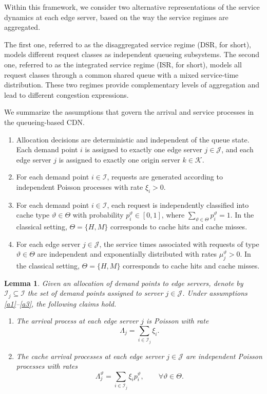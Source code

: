 \documentclass[a4paper,11pt,reqno]{amsart}
\newtheorem{lemma}{Lemma}
\newcommand{\K}{\mathcal{K}}
\newcommand{\I}{\mathcal{I}}
\newcommand{\J}{\mathcal{J}}
\begin{document}
Within this framework, we consider two alternative representations of the service dynamics at each edge server, based on the way the service regimes are aggregated.

The first one, referred to as the disaggregated service regime (DSR, for short), models different request classes as independent queueing subsystems. The second one, referred to as the integrated service regime (ISR, for short), models all request classes through a common shared queue with a mixed service-time distribution. These two regimes provide complementary levels of aggregation and lead to different congestion expressions.

We summarize the assumptions that govern the arrival and service processes in the queueing-based CDN.

\begin{enumerate}[label=(A\arabic*), ref={\rm A\arabic*}]
\item \label{a1}
Allocation decisions are deterministic and independent of the queue state. Each demand point $i$ is assigned to exactly one edge server $j\in\J$, and each edge server $j$ is assigned to exactly one origin server $k\in\K$.

\item \label{a2}
For each demand point $i\in\I$, requests are generated according to independent Poisson processes with rate $\xi_i>0$.

\item \label{a3}
For each demand point $i\in\I$, each request is independently classified into cache type $\vartheta \in \Theta$ with probability $p_i^\vartheta \in [0,1]$, where $\sum_{\vartheta \in \Theta} p_i^\vartheta = 1$. In the classical setting, $\Theta=\{H,M\}$ corresponds to cache hits and cache misses.

\item \label{a4}
For each edge server $j\in\J$, the service times associated with requests of type $\vartheta \in \Theta$ are independent and exponentially distributed with rates $\mu^\vartheta_j>0$. In the classical setting, $\Theta=\{H,M\}$ corresponds to cache hits and cache misses.
\end{enumerate}

\begin{lemma}\label{lemma:arrivals}
   Given an allocation of demand points to edge servers, denote by $\I_j\subseteq \I$ the set of demand points assigned to server $j \in \J$. Under assumptions \ref{a1}--\ref{a3}, the following claims hold.

\begin{enumerate}[label=\roman*), ref=\roman*]

\item The arrival process at each edge server $j$ is Poisson with rate
$$
\Lambda_j = \sum_{i\in\I_j}\xi_i.
$$

\item The cache arrival processes at each edge server $j\in\J$ are independent Poisson processes with rates
$$
\Lambda^\vartheta_j=\sum_{i\in\I_j}\xi_i p_i^\vartheta,
\qquad \forall \vartheta\in\Theta.
$$
\end{enumerate}
\end{lemma}
\end{document}

